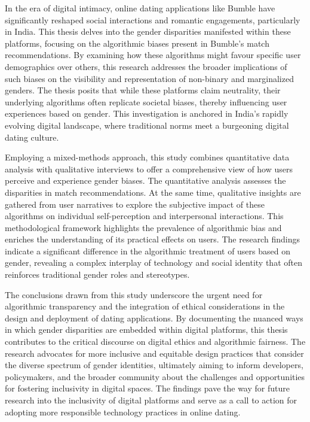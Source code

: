 In the era of digital intimacy, online dating applications like Bumble have significantly reshaped social interactions and romantic engagements, particularly in India. This thesis delves into the gender disparities manifested within these platforms, focusing on the algorithmic biases present in Bumble's match recommendations. By examining how these algorithms might favour specific user demographics over others, this research addresses the broader implications of such biases on the visibility and representation of non-binary and marginalized genders. The thesis posits that while these platforms claim neutrality, their underlying algorithms often replicate societal biases, thereby influencing user experiences based on gender. This investigation is anchored in India's rapidly evolving digital landscape, where traditional norms meet a burgeoning digital dating culture.

Employing a mixed-methods approach, this study combines quantitative data analysis with qualitative interviews to offer a comprehensive view of how users perceive and experience gender biases. The quantitative analysis assesses the disparities in match recommendations. At the same time, qualitative insights are gathered from user narratives to explore the subjective impact of these algorithms on individual self-perception and interpersonal interactions. This methodological framework highlights the prevalence of algorithmic bias and enriches the understanding of its practical effects on users. The research findings indicate a significant difference in the algorithmic treatment of users based on gender, revealing a complex interplay of technology and social identity that often reinforces traditional gender roles and stereotypes.

The conclusions drawn from this study underscore the urgent need for algorithmic transparency and the integration of ethical considerations in the design and deployment of dating applications. By documenting the nuanced ways in which gender disparities are embedded within digital platforms, this thesis contributes to the critical discourse on digital ethics and algorithmic fairness. The research advocates for more inclusive and equitable design practices that consider the diverse spectrum of gender identities, ultimately aiming to inform developers, policymakers, and the broader community about the challenges and opportunities for fostering inclusivity in digital spaces. The findings pave the way for future research into the inclusivity of digital platforms and serve as a call to action for adopting more responsible technology practices in online dating.